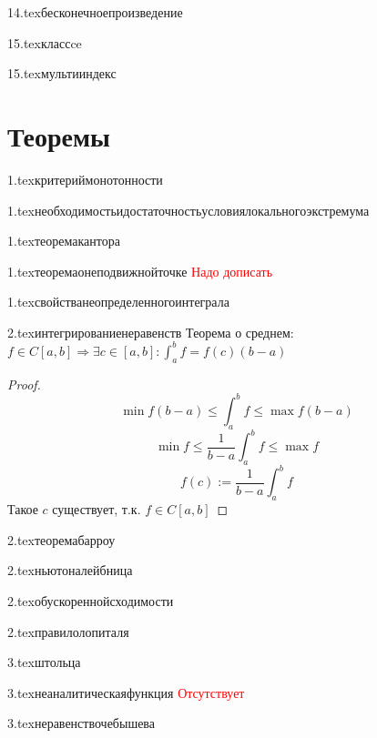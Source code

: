 {14.tex}{бесконечноепроизведение}

{15.tex}{классce}

{15.tex}{мультииндекс}

\section{Теоремы}

{1.tex}{критериймонотонности}

{1.tex}{необходимостьидостаточностьусловиялокальногоэкстремума}

{1.tex}{теоремакантора}

{1.tex}{теоремаонеподвижнойточке}
\textcolor{red}{Надо дописать}

{1.tex}{свойстванеопределенногоинтеграла}
\label{integralproperties}

{2.tex}{интегрированиенеравенств}
Теорема о среднем: $f\in C[a,b] \Rightarrow \exists c\in[a,b] : \int_a^b f = f(c)(b-a)$
\begin{proof}
    $$\min f(b-a)\le \int_a^b f \le \max f(b-a)$$
    $$\min f\le \frac{1}{b-a}\int_a^b f \le \max f$$
    $$f(c) := \frac{1}{b-a}\int_a^b f$$
    Такое $c$ существует, т.к. $f\in C[a,b]$
\end{proof}

{2.tex}{теоремабарроу}

{2.tex}{ньютоналейбница}

{2.tex}{обускореннойсходимости}

{2.tex}{правилолопиталя}

{3.tex}{штольца}

{3.tex}{неаналитическаяфункция}
\textcolor{red}{Отсутствует}

{3.tex}{неравенствочебышева}

